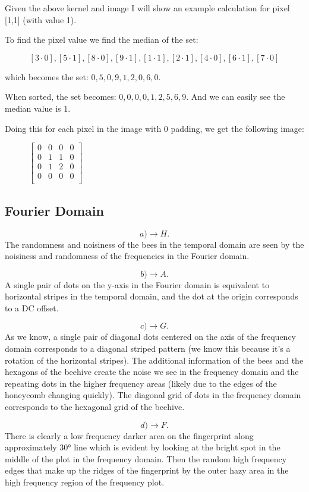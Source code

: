 \documentclass[12pt, letterpaper]{article}
\begin{document}
Given the above kernel and image I will show an example calculation for pixel [1,1] (with value 1). 

To find the pixel value we find the median of the set:

\[[3 \cdot 0],[5 \cdot 1],[8 \cdot 0],[9 \cdot 1],[1 \cdot 1],[2 \cdot 1],[4 \cdot 0],[6 \cdot 1],[7 \cdot 0]\] 

which becomes the set: $0,5,0,9,1,2,0,6,0$.


When sorted, the set becomes: $0,0,0,0,1,2,5,6,9$. And we can easily see the median value is $1$.

Doing this for each pixel in the image with 0 padding, we get the following image:

\begin{figure}[H]
    \centering
    $\begin{bmatrix}
    0&0&0&0\\
    0&1&1&0\\
    0&1&2&0\\
    0&0&0&0\\
    \end{bmatrix}$
\end{figure}

\subsection{Fourier Domain}

\[ a) \xrightarrow{} H. \]
The randomness and noisiness of the bees in the temporal domain are seen by the noisiness and randomness of the frequencies in the Fourier domain.

\[ b) \xrightarrow{} A. \]
A single pair of dots on the y-axis in the Fourier domain is equivalent to horizontal stripes in the temporal domain, and the dot at the origin corresponds to a DC offset.

\[ c) \xrightarrow{} G. \]
As we know, a single pair of diagonal dots centered on the axis of the frequency domain corresponds to a diagonal striped pattern (we know this because it's a rotation of the horizontal stripes). The additional information of the bees and the hexagons of the beehive create the noise we see in the frequency domain and the repeating dots in the higher frequency areas (likely due to the edges of the honeycomb changing quickly). The diagonal grid of dots in the frequency domain corresponds to the hexagonal grid of the beehive.

\[ d) \xrightarrow{} F. \]
There is clearly a low frequency darker area on the fingerprint along approximately \ang{30} line which is evident by looking at the bright spot in the middle of the plot in the frequency domain. Then the random high frequency edges that make up the
ridges of the fingerprint by the outer hazy area in the high frequency region of the frequency plot.
\end{document}
